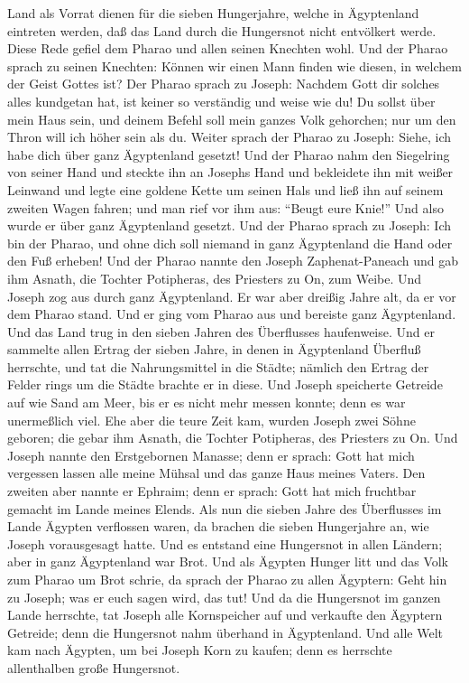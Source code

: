Land als Vorrat dienen für die sieben Hungerjahre, welche in Ägyptenland
eintreten werden, daß das Land durch die Hungersnot nicht entvölkert
werde.  Diese Rede gefiel dem Pharao und allen seinen
Knechten wohl.  Und der Pharao sprach zu seinen Knechten:
Können wir einen Mann finden wie diesen, in welchem der Geist Gottes
ist?  Der Pharao sprach zu Joseph: Nachdem Gott dir
solches alles kundgetan hat, ist keiner so verständig und weise wie du!
 Du sollst über mein Haus sein, und deinem Befehl soll
mein ganzes Volk gehorchen; nur um den Thron will ich höher sein als du.
 Weiter sprach der Pharao zu Joseph: Siehe, ich habe dich
über ganz Ägyptenland gesetzt!  Und der Pharao nahm den
Siegelring von seiner Hand und steckte ihn an Josephs Hand und
bekleidete ihn mit weißer Leinwand und legte eine goldene Kette um
seinen Hals  und ließ ihn auf seinem zweiten Wagen
fahren; und man rief vor ihm aus: ``Beugt eure Knie!'' Und also wurde er
über ganz Ägyptenland gesetzt.  Und der Pharao sprach zu
Joseph: Ich bin der Pharao, und ohne dich soll niemand in ganz
Ägyptenland die Hand oder den Fuß erheben!  Und der
Pharao nannte den Joseph Zaphenat-Paneach und gab ihm Asnath, die
Tochter Potipheras, des Priesters zu On, zum Weibe.  Und
Joseph zog aus durch ganz Ägyptenland. Er war aber dreißig Jahre alt, da
er vor dem Pharao stand. Und er ging vom Pharao aus und bereiste ganz
Ägyptenland.  Und das Land trug in den sieben Jahren des
Überflusses haufenweise.  Und er sammelte allen Ertrag
der sieben Jahre, in denen in Ägyptenland Überfluß herrschte, und tat
die Nahrungsmittel in die Städte; nämlich den Ertrag der Felder rings um
die Städte brachte er in diese.  Und Joseph speicherte
Getreide auf wie Sand am Meer, bis er es nicht mehr messen konnte; denn
es war unermeßlich viel.  Ehe aber die teure Zeit kam,
wurden Joseph zwei Söhne geboren; die gebar ihm Asnath, die Tochter
Potipheras, des Priesters zu On.  Und Joseph nannte den
Erstgebornen Manasse; denn er sprach: Gott hat mich vergessen lassen
alle meine Mühsal und das ganze Haus meines Vaters.  Den
zweiten aber nannte er Ephraim; denn er sprach: Gott hat mich fruchtbar
gemacht im Lande meines Elends.  Als nun die sieben Jahre
des Überflusses im Lande Ägypten verflossen waren,  da
brachen die sieben Hungerjahre an, wie Joseph vorausgesagt hatte. Und es
entstand eine Hungersnot in allen Ländern; aber in ganz Ägyptenland war
Brot.  Und als Ägypten Hunger litt und das Volk zum
Pharao um Brot schrie, da sprach der Pharao zu allen Ägyptern: Geht hin
zu Joseph; was er euch sagen wird, das tut!  Und da die
Hungersnot im ganzen Lande herrschte, tat Joseph alle Kornspeicher auf
und verkaufte den Ägyptern Getreide; denn die Hungersnot nahm überhand
in Ägyptenland.  Und alle Welt kam nach Ägypten, um bei
Joseph Korn zu kaufen; denn es herrschte allenthalben große Hungersnot.


